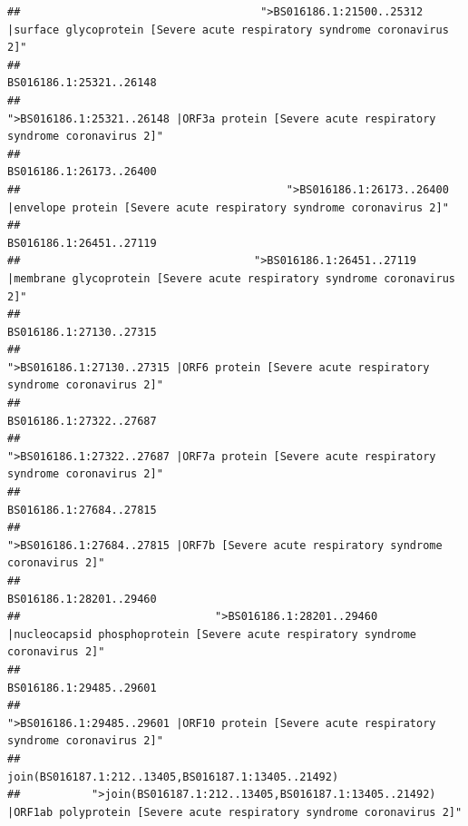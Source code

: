 \documentclass[
]{article}
\begin{document}
\begin{verbatim}
##                                     ">BS016186.1:21500..25312 |surface glycoprotein [Severe acute respiratory syndrome coronavirus 2]" 
##                                                                                                                BS016186.1:25321..26148 
##                                            ">BS016186.1:25321..26148 |ORF3a protein [Severe acute respiratory syndrome coronavirus 2]" 
##                                                                                                                BS016186.1:26173..26400 
##                                         ">BS016186.1:26173..26400 |envelope protein [Severe acute respiratory syndrome coronavirus 2]" 
##                                                                                                                BS016186.1:26451..27119 
##                                    ">BS016186.1:26451..27119 |membrane glycoprotein [Severe acute respiratory syndrome coronavirus 2]" 
##                                                                                                                BS016186.1:27130..27315 
##                                             ">BS016186.1:27130..27315 |ORF6 protein [Severe acute respiratory syndrome coronavirus 2]" 
##                                                                                                                BS016186.1:27322..27687 
##                                            ">BS016186.1:27322..27687 |ORF7a protein [Severe acute respiratory syndrome coronavirus 2]" 
##                                                                                                                BS016186.1:27684..27815 
##                                                    ">BS016186.1:27684..27815 |ORF7b [Severe acute respiratory syndrome coronavirus 2]" 
##                                                                                                                BS016186.1:28201..29460 
##                              ">BS016186.1:28201..29460 |nucleocapsid phosphoprotein [Severe acute respiratory syndrome coronavirus 2]" 
##                                                                                                                BS016186.1:29485..29601 
##                                            ">BS016186.1:29485..29601 |ORF10 protein [Severe acute respiratory syndrome coronavirus 2]" 
##                                                                                    join(BS016187.1:212..13405,BS016187.1:13405..21492) 
##           ">join(BS016187.1:212..13405,BS016187.1:13405..21492) |ORF1ab polyprotein [Severe acute respiratory syndrome coronavirus 2]" 

\end{verbatim}
\end{document}
